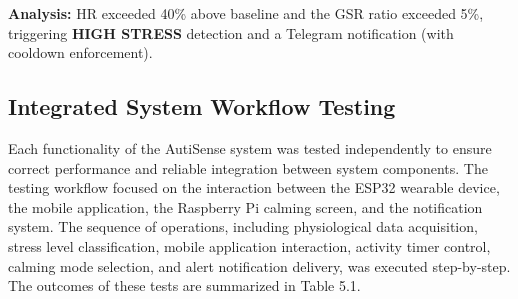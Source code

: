 \documentclass[a4paper,12pt]{report}
\begin{document}
\textbf{Analysis:} HR exceeded 40\% above baseline and the GSR ratio exceeded 5\%, triggering \textbf{HIGH STRESS} detection and a Telegram notification (with cooldown enforcement).

\subsection{Integrated System Workflow Testing}
Each functionality of the AutiSense system was tested independently to ensure correct performance and reliable integration between system components. The testing workflow focused on the interaction between the ESP32 wearable device, the mobile application, the Raspberry Pi calming screen, and the notification system. The sequence of operations, including physiological data acquisition, stress level classification, mobile application interaction, activity timer control, calming mode selection, and alert notification delivery, was executed step-by-step. The outcomes of these tests are summarized in Table 5.1.
\clearpage
\end{document}
